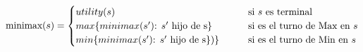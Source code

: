 \documentclass[preview]{standalone}
\begin{document}
\begin{align*}
\text{minimax($s$)} =  \begin{cases}
                                 utility(s) \qquad &\text{si $s$ es terminal} \cr
                                 max\{minimax(\text{$s'$): $s'$ hijo de }$s$\}\qquad &\text{si es el turno de Max en $s$} \cr
                                 min\{minimax(\text{$s'$): $s'$ hijo de }$s$\})\}\qquad &\text{si es el turno de Min en $s$} \cr
                                 \end{cases}
\end{align*}
\end{document}
